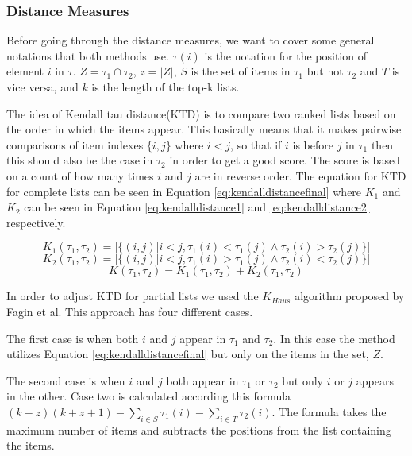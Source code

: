 \subsubsection{Distance Measures}\label{sec:distance}
Before going through the distance measures, we want to cover some general notations that both methods use. $\tau(i)$ is the notation for the position of element $i$ in $\tau$. $Z = \tau_1 \cap \tau_2$, $z=|Z|$, $S$ is the set of items in $\tau_1$ but not $\tau_2$ and $T$ is vice versa, and $k$ is the length of the top-k lists.

The idea of Kendall tau distance(KTD) is to compare two ranked lists based on the order in which the items appear. This basically means that it makes pairwise comparisons of item indexes $\{i,j\}$ where $i < j$, so that if $i$ is before $j$ in $\tau_1$ then this should also be the case in $\tau_2$ in order to get a good score. The score is based on a count of how many times $i$ and $j$ are in reverse order. The equation for KTD for complete lists can be seen in Equation \ref{eq:kendalldistancefinal} where $K_1$ and $K_2$ can be seen in Equation \ref{eq:kendalldistance1} and \ref{eq:kendalldistance2} respectively.

\begin{equation}\label{eq:kendalldistance1}
K_1(\tau_1,\tau_2) = | \{(i,j) | i < j, \tau_1 (i) < \tau_1 (j) \land \tau_2 (i) > \tau_2 (j)\}|
\end{equation}
\begin{equation}\label{eq:kendalldistance2}
K_2(\tau_1,\tau_2) = | \{(i,j) | i < j, \tau_1 (i) > \tau_1 (j) \land \tau_2 (i) < \tau_2 (j) \} |
\end{equation}
\begin{equation}\label{eq:kendalldistancefinal}
K(\tau_1,\tau_2) = K_1(\tau_1,\tau_2) + K_2(\tau_1,\tau_2)
\end{equation}

In order to adjust KTD for partial lists we used the $K_{Haus}$ algorithm proposed by Fagin et al\cite{comparing:topk}. This approach has four different cases.

The first case is when both $i$ and $j$ appear in $\tau_1$ and $\tau_2$. In this case the method utilizes Equation \ref{eq:kendalldistancefinal} but only on the items in the set, $Z$.

The second case is when $i$ and $j$ both appear in $\tau_1$ or $\tau_2$ but only $i$ or $j$ appears in the other. Case two is calculated according this formula $(k-z)(k+z+1)- \sum_{i \in S} \tau_1(i)- \sum_{i \in T} \tau_2(i)$. The formula takes the maximum number of items and subtracts the positions from the list containing the items.

